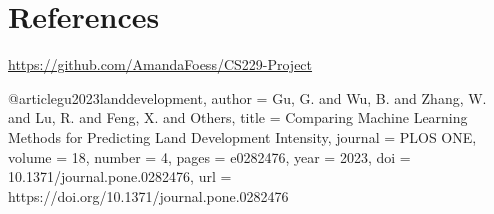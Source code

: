 \section{References}



\url{https://github.com/AmandaFoess/CS229-Project}

@article{gu2023landdevelopment, author = {Gu, G. and Wu, B. and Zhang, W. and Lu, R. and Feng, X. and Others}, title = {Comparing Machine Learning Methods for Predicting Land Development Intensity}, journal = {PLOS ONE}, volume = {18}, number = {4}, pages = {e0282476}, year = {2023}, doi = {10.1371/journal.pone.0282476}, url = {https://doi.org/10.1371/journal.pone.0282476} }